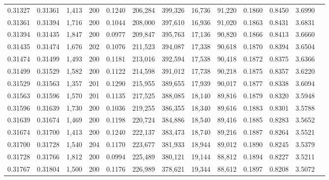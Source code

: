 \begin{tabular}{rrrrrrrrrrrrr}
0.31327 & 0.31361 & 1,413 & 200 &                                     0.1240 & 206,284 & 399,326 &  16,736 &  91,220 & 0.1860 & 0.8450 & 3.6990 \\
0.31361 & 0.31394 & 1,716 & 200 &                                     0.1044 & 208,000 & 397,610 &  16,936 &  91,020 & 0.1863 & 0.8431 & 3.6831 \\
0.31394 & 0.31435 & 1,847 & 200 &                                     0.0977 & 209,847 & 395,763 &  17,136 &  90,820 & 0.1866 & 0.8413 & 3.6660 \\
0.31435 & 0.31474 & 1,676 & 202 &                                     0.1076 & 211,523 & 394,087 &  17,338 &  90,618 & 0.1870 & 0.8394 & 3.6504 \\
0.31474 & 0.31499 & 1,493 & 200 &                                     0.1181 & 213,016 & 392,594 &  17,538 &  90,418 & 0.1872 & 0.8375 & 3.6366 \\
0.31499 & 0.31529 & 1,582 & 200 &                                     0.1122 & 214,598 & 391,012 &  17,738 &  90,218 & 0.1875 & 0.8357 & 3.6220 \\
0.31529 & 0.31563 & 1,357 & 201 &                                     0.1290 & 215,955 & 389,655 &  17,939 &  90,017 & 0.1877 & 0.8338 & 3.6094 \\
0.31563 & 0.31596 & 1,570 & 201 &                                     0.1135 & 217,525 & 388,085 &  18,140 &  89,816 & 0.1879 & 0.8320 & 3.5948 \\
0.31596 & 0.31639 & 1,730 & 200 &                                     0.1036 & 219,255 & 386,355 &  18,340 &  89,616 & 0.1883 & 0.8301 & 3.5788 \\
0.31639 & 0.31674 & 1,469 & 200 &                                     0.1198 & 220,724 & 384,886 &  18,540 &  89,416 & 0.1885 & 0.8283 & 3.5652 \\
0.31674 & 0.31700 & 1,413 & 200 &                                     0.1240 & 222,137 & 383,473 &  18,740 &  89,216 & 0.1887 & 0.8264 & 3.5521 \\
0.31700 & 0.31728 & 1,540 & 204 &                                     0.1170 & 223,677 & 381,933 &  18,944 &  89,012 & 0.1890 & 0.8245 & 3.5379 \\
0.31728 & 0.31766 & 1,812 & 200 &                                     0.0994 & 225,489 & 380,121 &  19,144 &  88,812 & 0.1894 & 0.8227 & 3.5211 \\
0.31767 & 0.31804 & 1,500 & 200 &                                     0.1176 & 226,989 & 378,621 &  19,344 &  88,612 & 0.1897 & 0.8208 & 3.5072 \\

\end{tabular}
